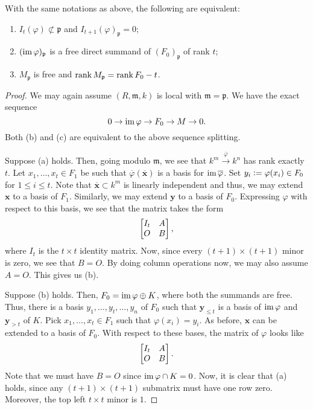 \documentclass[12pt]{article}
\begin{document}
\begin{lem} 
	With the same notations as above, the following are equivalent:
	\begin{enumerate}[label=(\alph*)]
		\item $I_{t}(\varphi) \not\subset \mathfrak{p}$ and $I_{t + 1}(\varphi)_{\mathfrak{p}} = 0$;
		\item $(\operatorname{im} \varphi)_{\mathfrak{p}}$ is a free direct summand of $(F_{0})_{\mathfrak{p}}$ of rank $t$;
		\item $M_{\mathfrak{p}}$ is free and $\operatorname{rank} M_{\mathfrak{p}} = \operatorname{rank} F_{0} - t$.
	\end{enumerate}
\end{lem}
\begin{proof} 
	We may again assume $(R, \mathfrak{m}, k)$ is local with $\mathfrak{m} = \mathfrak{p}$. We have the exact sequence
	\begin{equation*} 
		0 \to \operatorname{im} \varphi \to F_{0} \to M \to 0.
	\end{equation*}
	Both (b) and (c) are equivalent to the above sequence splitting.

	Suppose (a) holds. Then, going modulo $\mathfrak{m}$, we see that $k^{m} \xrightarrow{\overline{\varphi}} k^{n}$ has rank exactly $t$. \newline
	Let $x_{1}, \ldots, x_{t} \in F_{1}$ be such that $\overline{\varphi}(\overline{\mathbf{x}})$ is a basis for $\operatorname{im} \overline{\varphi}$. Set $y_{i} \vcentcolon= \varphi(x_{i}) \in F_{0}$ for $1 \le i \le t$. \newline
	Note that $\overline{\mathbf{x}} \subset k^{m}$ is linearly independent and thus, we may extend $\mathbf{x}$ to a basis of $F_{1}$. Similarly, we may extend $\mathbf{y}$ to a basis of $F_{0}$. Expressing $\varphi$ with respect to this basis, we see that the matrix takes the form
	\begin{equation*} 
		\begin{bmatrix} I_{t} & A \\ O & B \end{bmatrix},
	\end{equation*}
	where $I_{t}$ is the $t \times t$ identity matrix. Now, since every $(t + 1) \times (t + 1)$ minor is zero, we see that $B = O$. By doing column operations now, we may also assume $A = O$. This gives us (b).

	Suppose (b) holds. Then, $F_{0} = \operatorname{im} \varphi \oplus K$, where both the summands are free. Thus, there is a basis $y_{1}, \ldots, y_{t}, \ldots, y_{n}$ of $F_{0}$ such that $\mathbf{y}_{\le t}$ is a basis of $\operatorname{im} \varphi$ and $\mathbf{y}_{>t}$ of $K$. \newline
	Pick $x_{1}, \ldots, x_{t} \in F_{1}$ such that $\varphi(x_{i}) = y_{i}$. As before, $\mathbf{x}$ can be extended to a basis of $F_{0}$. With respect to these bases, the matrix of $\varphi$ looks like
	\begin{equation*} 
		\begin{bmatrix} I_{t} & A \\ O & B \end{bmatrix}.
	\end{equation*}
	Note that we must have $B = O$ since $\operatorname{im} \varphi \cap K = 0$. Now, it is clear that (a) holds, since any $(t + 1) \times (t + 1)$ submatrix must have one row zero. Moreover, the top left $t \times t$ minor is $1$.
\end{proof}
\end{document}
